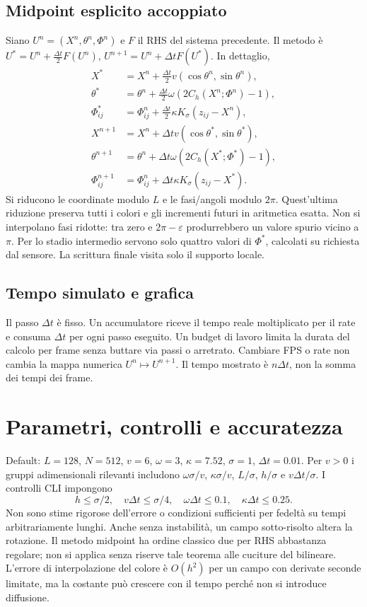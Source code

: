 \documentclass[11pt,a4paper]{article}
\begin{document}
\subsection{Midpoint esplicito accoppiato}
Siano $U^n=(X^n,\theta^n,\Phi^n)$ e $F$ il RHS del sistema precedente.
Il metodo è $U^*=U^n+\frac{\Delta t}{2}F(U^n)$,
$U^{n+1}=U^n+\Delta t F(U^*)$. In dettaglio,
\begin{align}
 X^*&=X^n+\tfrac{\Delta t}{2}v(\cos\theta^n,\sin\theta^n),\\
 \theta^*&=\theta^n+\tfrac{\Delta t}{2}\omega(2C_h(X^n;\Phi^n)-1),\\
 \Phi^*_{ij}&=\Phi^n_{ij}+\tfrac{\Delta t}{2}\kappa K_\sigma(z_{ij}-X^n),\\
 X^{n+1}&=X^n+\Delta t v(\cos\theta^*,\sin\theta^*),\\
 \theta^{n+1}&=\theta^n+\Delta t\omega(2C_h(X^*;\Phi^*)-1),\\
 \Phi^{n+1}_{ij}&=\Phi^n_{ij}+\Delta t\kappa K_\sigma(z_{ij}-X^*).
\end{align}
Si riducono le coordinate modulo $L$ e le fasi/angoli modulo $2\pi$.
Quest'ultima riduzione preserva tutti i colori e gli incrementi futuri
in aritmetica esatta. Non si interpolano fasi ridotte: tra zero e
$2\pi-\varepsilon$ produrrebbero un valore spurio vicino a $\pi$.
Per lo stadio intermedio servono solo quattro valori di $\Phi^*$, calcolati
su richiesta dal sensore. La scrittura finale visita solo il supporto locale.

\subsection{Tempo simulato e grafica}
Il passo $\Delta t$ è fisso. Un accumulatore riceve il tempo reale moltiplicato
per il rate e consuma $\Delta t$ per ogni passo eseguito. Un budget di lavoro
limita la durata del calcolo per frame senza buttare via passi o arretrato.
Cambiare FPS o rate non cambia la mappa numerica $U^n\mapsto U^{n+1}$.
Il tempo mostrato è $n\Delta t$, non la somma dei tempi dei frame.

\section{Parametri, controlli e accuratezza}
Default: $L=128$, $N=512$, $v=6$, $\omega=3$, $\kappa=7.52$,
$\sigma=1$, $\Delta t=0.01$. Per $v>0$ i gruppi adimensionali rilevanti
includono $\omega\sigma/v$, $\kappa\sigma/v$, $L/\sigma$,
$h/\sigma$ e $v\Delta t/\sigma$.
I controlli CLI impongono
\begin{equation}
 h\le\sigma/2,\quad v\Delta t\le\sigma/4,\quad
 \omega\Delta t\le0.1,\quad\kappa\Delta t\le0.25.
\end{equation}
Non sono stime rigorose dell'errore o condizioni sufficienti per fedeltà
su tempi arbitrariamente lunghi. Anche senza instabilità, un campo
sotto-risolto altera la rotazione. Il metodo midpoint ha ordine classico due
per RHS abbastanza regolare; non si applica senza riserve tale teorema
alle cuciture del bilineare. L'errore di interpolazione del colore è
$O(h^2)$ per un campo con derivate seconde limitate, ma la costante può
crescere con il tempo perché non si introduce diffusione.
\end{document}
